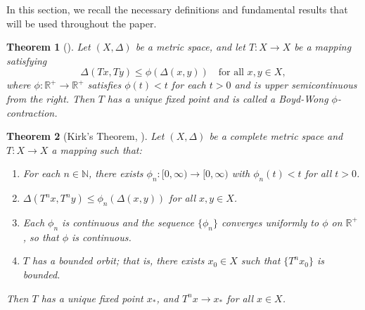 \documentclass{birkjour}
\newtheorem{thm}{Theorem}[section]
\theoremstyle{definition}
\theoremstyle{remark}
\numberwithin{equation}{section}
\begin{document}
In this section, we recall the necessary definitions and fundamental results that will be used throughout the paper.

\begin{thm}[\cite{boyd1969nonlinear}]\label{thm:boyd-wong}
Let \((X, \Delta)\) be a metric space, and let \(T: X \to X\) be a mapping satisfying
\[
\Delta(Tx, Ty) \leq \phi(\Delta(x, y)) \quad \text{for all } x, y \in X,
\]
where \(\phi: \mathbb{R}^+ \to \mathbb{R}^+\) satisfies \(\phi(t) < t\) for each \(t > 0\) and is upper semicontinuous from the right. Then \(T\) has a unique fixed point and is called a \emph{Boyd-Wong \(\phi\)-contraction}.
\end{thm}

\begin{thm}[Kirk's Theorem, \cite{kirk2003}]\label{thm:kirk}
Let \((X, \Delta)\) be a complete metric space and \(T: X \to X\) a mapping such that:
\begin{enumerate}
    \item For each \(n \in \mathbb{N}\), there exists \(\phi_n : [0, \infty) \to [0, \infty)\) with \(\phi_n(t) < t\) for all \(t > 0\).
    \item \(\Delta(T^n x, T^n y) \leq \phi_n(\Delta(x,y))\) for all \(x, y \in X\).
    \item Each \(\phi_n\) is continuous and the sequence \(\{\phi_n\}\) converges uniformly to \(\phi\) on \(\mathbb{R}^+\), so that \(\phi\) is continuous.
    \item \(T\) has a bounded orbit; that is, there exists \(x_0 \in X\) such that \(\{T^n x_0\}\) is bounded.
\end{enumerate}
Then \(T\) has a unique fixed point \(x_*\), and \(T^n x \to x_*\) for all \(x \in X\).
\end{thm}
\end{document}
